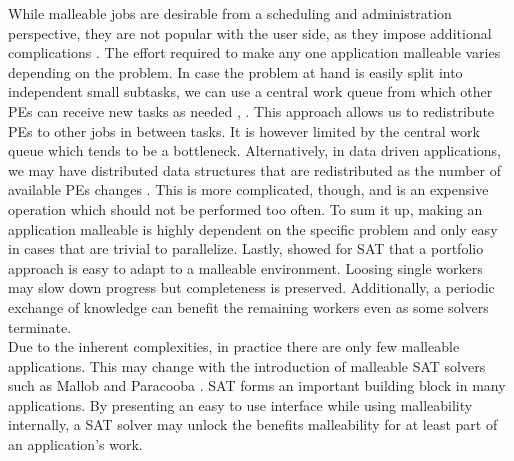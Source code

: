 While malleable jobs are desirable from a scheduling and administration perspective, they are not popular with the user side, as they impose additional complications \cite{feitelson1997job}. The effort required to make any one application malleable varies depending on the problem. In case the problem at hand is easily split into independent small subtasks, we can use a central work queue from which other PEs can receive new tasks as needed \cite{feitelson1997job}, \cite{tucker1989process}. This approach allows us to redistribute PEs to other jobs in between tasks. It is however limited by the central work queue which tends to be a bottleneck. Alternatively, in data driven applications, we may have distributed data structures that are redistributed as the number of available PEs changes \cite{feitelson1997job}. This is more complicated, though, and is an expensive operation which should not be performed too often. To sum it up, making an application malleable is highly dependent on the specific problem and only easy in cases that are trivial to parallelize. Lastly, \cite{schreiber2021scalable} showed for SAT that a portfolio approach is easy to adapt to a malleable environment. Loosing single workers may slow down progress but completeness is preserved. Additionally, a periodic exchange of knowledge can benefit the remaining workers even as some solvers terminate. \\
Due to the inherent complexities, in practice there are only few malleable applications. This may change with the introduction of malleable SAT solvers such as Mallob \cite{schreiber2021scalable} and Paracooba \cite{heisinger2020distributed}. SAT forms an important building block in many applications. By presenting an easy to use interface while using malleability internally, a SAT solver may unlock the benefits malleability for at least part of an application's work.

